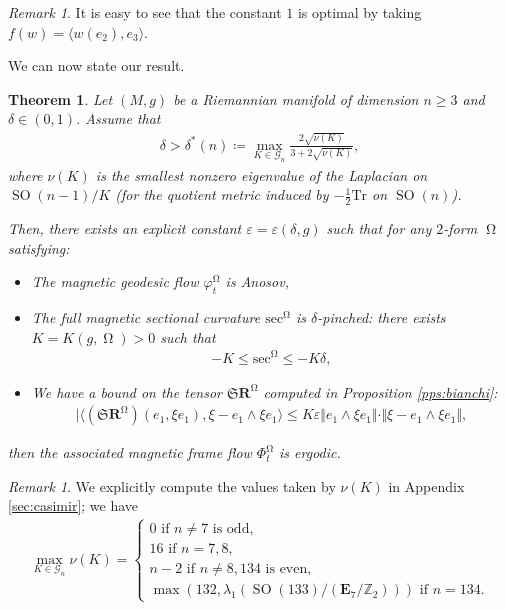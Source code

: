 \documentclass[12pt]{amsart}
\numberwithin{numbering}{section}
\theoremstyle{plain}
\newtheorem{thm}[numbering]{Theorem}
\theoremstyle{definition}
\theoremstyle{remark}
\newtheorem{rmq}[numbering]{Remark}
\numberwithin{equation}{section}
\DeclareMathOperator{\SO}{SO}
\DeclareMathOperator{\mg}{\Omega}
\newcommand{\rsfm}{\mathbf{R}^{\mg}}
\newcommand{\Z}{\mathbb{Z}}
\newcommand{\frk}[1]{\mathfrak{#1}}
\begin{document}
\begin{rmq}
It is easy to see that the constant $1$ is optimal by taking $f(w) = \langle w(e_2), e_3 \rangle$.
\end{rmq}

We can now state our result.

\begin{thm} \label{thm:ergo_mag_frame_flow}
Let $(M, g)$ be a Riemannian manifold of dimension $n \geq 3$ and $\delta \in (0, 1)$. Assume that 
\begin{align*}
\delta > \delta^*(n) \coloneq \max_{K \in \mathcal{G}_n} \frac{2 \sqrt{\nu(K)}}{3+2 \sqrt{\nu(K)}},
\end{align*}
where $\nu(K)$ is the smallest nonzero eigenvalue of the Laplacian on $\SO(n-1)/K$ (for the quotient metric induced by $- \frac{1}{2} \mathrm{Tr}$ on $\SO(n)$). 

Then, there exists an explicit constant $\varepsilon = \varepsilon(\delta, g)$ such that for any $2$-form $\mg$ satisfying:
\begin{itemize}
\item[(0)] The magnetic geodesic flow $\varphi_t^{\mg}$ is Anosov,
\item[(i)] The full magnetic sectional curvature $\mathrm{sec}^{\mg}$ is $\delta$-pinched: there exists $K = K(g, \mg) > 0$ such that
\begin{align*}
-K \leq \mathrm{sec}^{\mg} \leq - K \delta,
\end{align*}
\item[(ii)] We have a bound on the tensor $\frk{S} \rsfm$ computed in Proposition \ref{pps:bianchi}:
\begin{align} \label{eq:bound_sr0}
\vert  \langle (\frk{S} \rsfm)(e_1, \xi e_1), \xi - e_1 \wedge \xi e_1 \rangle \leq K \varepsilon \Vert e_1 \wedge \xi e_1 \Vert \cdot \Vert \xi - e_1 \wedge \xi e_1 \Vert,
\end{align}
\end{itemize}
then the associated magnetic frame flow $\Phi_t^{\mg}$ is ergodic.
\end{thm}

\begin{rmq}
We explicitly compute the values taken by $\nu(K)$ in Appendix \ref{sec:casimir}; we have 
\begin{align*} 
\max_{K \in \mathcal{G}_n} \nu(K) = 
\begin{cases*}
   0 \text{ if $n \neq 7$ is odd,} \\
   16 \text{ if $n = 7, 8$,} \\
   n-2 \text{ if $n \neq 8, 134$ is even,} \\ 
   \max(132, \lambda_1(\SO(133) / (\mathbf{E}_7 / \Z_2))) \text{ if $n = 134$}.
\end{cases*}
\end{align*}
\end{rmq}
\end{document}
